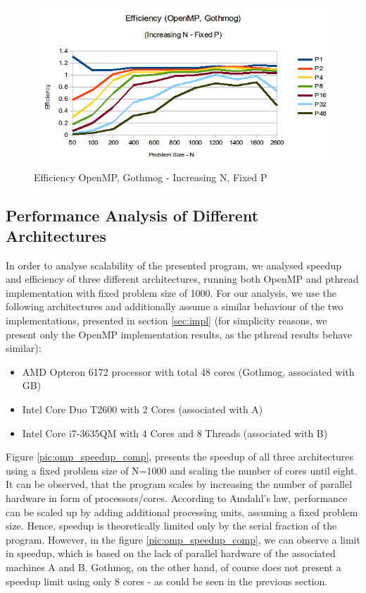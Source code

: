 \documentclass[conference]{IEEEtran}
\begin{document}
\begin{figure}[h]
  \centering
  \includegraphics[scale=0.42]{pic/omp_gothmog_efficiency-fixed-p.png} 
  \caption{Efficiency OpenMP, Gothmog - Increasing N, Fixed P}
  \label{pic:omp_eff_fixed-p}
\end{figure}

\subsection{Performance Analysis of Different Architectures}
\label{sec:analysis:openmp}

In order to analyse scalability of the presented program, we analysed speedup and efficiency of three different architectures, running both OpenMP and pthread implementation with fixed problem size of 1000. For our analysis, we use the following architectures and additionally assume a similar behaviour of the two implementations, presented in section \ref{sec:impl} (for simplicity reasons, we present only the OpenMP implementation results, as the pthread results behave similar):
\begin{itemize}
   \item AMD Opteron 6172 processor with total 48 cores (Gothmog, associated with GB)
   \item Intel Core Duo T2600 with 2 Cores (associated with A)
   \item Intel Core i7-3635QM with 4 Cores and 8 Threads (associated with B)
\end{itemize}

Figure \ref{pic:omp_speedup_comp}, presents the speedup of all three architectures using a fixed problem size of N=1000 and scaling the number of cores until eight. It can be observed, that the program scales by increasing the number of parallel hardware in form of processors/cores. According to Amdahl's law, performance can be scaled up by adding additional processing units, assuming a fixed problem size. Hence, speedup is theoretically limited only by the serial fraction of the program. However, in the figure \ref{pic:omp_speedup_comp}, we can observe a limit in speedup, which is based on the lack of parallel hardware of the associated machines A and B. Gothmog, on the other hand, of course does not present a speedup limit using only 8 cores - as could be seen in the previous section. 
\end{document}
